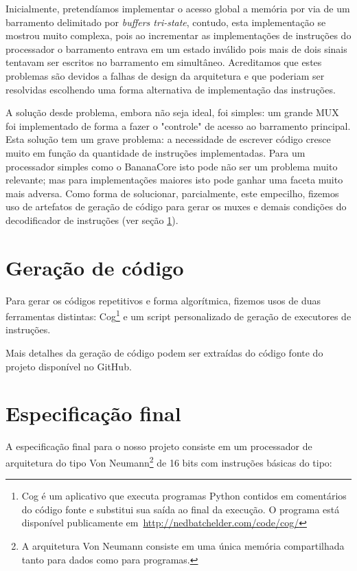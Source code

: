 \documentclass[11pt]{report}
\begin{document}
Inicialmente, pretendíamos implementar o acesso global a memória por via de um barramento delimitado por \emph{buffers tri-state}, contudo, esta implementação se mostrou muito complexa, pois ao incrementar as implementações de instruções do processador o barramento entrava em um estado inválido pois mais de dois sinais tentavam ser escritos no barramento em simultâneo. Acreditamos que estes problemas são devidos a falhas de design da arquitetura e que poderiam ser resolvidas escolhendo uma forma alternativa de implementação das instruções.

A solução desde problema, embora não seja ideal, foi simples: um grande MUX foi implementado de forma a fazer o "controle" de acesso ao barramento principal. Esta solução tem um grave problema: a necessidade de escrever código cresce muito em função da quantidade de instruções implementadas. Para um processador simples como o BananaCore isto pode não ser um problema muito relevante; mas para implementações maiores isto pode ganhar uma faceta muito mais adversa. Como forma de solucionar, parcialmente, este empecilho, fizemos uso de artefatos de geração de código para gerar os muxes e demais condições do decodificador de instruções (ver seção \ref{sec:CodeGeneration}).


\section{Geração de código}
\label{sec:CodeGeneration}
Para gerar os códigos repetitivos e forma algorítmica, fizemos usos de duas ferramentas distintas: Cog\footnote{Cog é um aplicativo que executa programas Python contidos em comentários do código fonte e substitui sua saída ao final da execução. O programa está disponível publicamente \mbox{em \url{http://nedbatchelder.com/code/cog/}}} e um script personalizado de geração de executores de instruções.

Mais detalhes da geração de código podem ser extraídas do código fonte do projeto disponível no GitHub.


\section{Especificação final}
A especificação final para o nosso projeto consiste em um processador de arquitetura do tipo Von Neumann\footnote{A arquitetura Von Neumann consiste em uma única memória compartilhada tanto para dados como para programas.} de 16 bits com instruções básicas do tipo:
\end{document}
